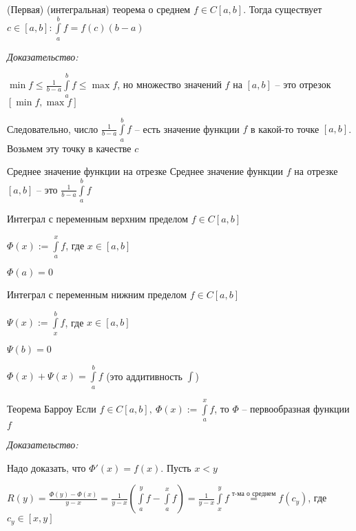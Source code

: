 \documentclass[12pt]{article}
\begin{document}
\begin{theo}{(Первая) (интегральная) теорема о среднем}
    $f \in C[a, b]$. Тогда существует $c \in [a, b] : \int\limits_a^b f = f(c)(b - a)$
\end{theo}

\textit{Доказательство:}

$\min f \leq \frac{1}{b - a} \int\limits_a^b f \leq \max f$, но множество значений $f$ на $[a, b]$ -- это отрезок $[\min f, \max f]$

Следовательно, число $\frac{1}{b - a} \int\limits_a^b f$ -- есть значение функции $f$ в какой-то точке $[a, b]$. Возьмем эту точку в качестве $c$

\begin{defin}{Среднее значение функции на отрезке}
    Среднее значение функции $f$ на отрезке $[a, b]$ -- это $\frac{1}{b - a} \int\limits_a^b f$
\end{defin}

\begin{defin}{Интеграл с переменным верхним пределом}
    $f \in C[a, b]$

    $\Phi(x) := \int\limits_a^x f$, где $x \in [a, b]$
\end{defin}

\begin{Remark}{}
    $\Phi(a) = 0$
\end{Remark}

\begin{defin}{Интеграл с переменным нижним пределом}
    $f \in C[a, b]$

    $\Psi(x) := \int\limits_x^b f$, где $x \in [a, b]$
\end{defin}

\begin{Remark}{}
    $\Psi(b) = 0$

    $\Phi(x) + \Psi(x) = \int\limits_a^b f$ (это аддитивность $\int$)
\end{Remark}

\begin{theo}{Теорема Барроу}
    Если $f \in C[a, b],\ \Phi(x) := \int\limits_a^x f$, то $\Phi$ -- первообразная функции $f$
\end{theo}

\textit{Доказательство:}

Надо доказать, что $\Phi'(x) = f(x)$. Пусть $x < y$

$R(y) = \frac{\Phi(y) - \Phi(x)}{y - x} = \frac{1}{y - x} (\int\limits_a^y f - \int\limits_a^x f) = \frac{1}{y - x} \int\limits_x^y f \stackrel{\text{т-ма о среднем}}{=} f(c_y)$, где $c_y \in [x, y]$
\end{document}
